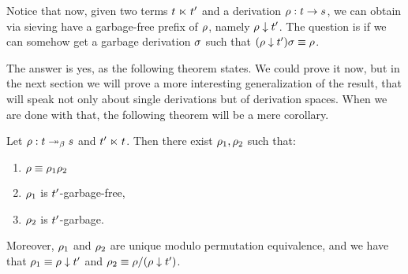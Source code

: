 Notice that now, given two terms $t \mathrel{\ltimes} t'$ and a derivation
$\rho : t \to s$, we can obtain via sieving have a garbage-free prefix
of $\rho$, namely $\rho \downarrow t'$.
The question is if we can somehow get a garbage derivation $\sigma$ such that
$(\rho \downarrow t') \sigma \equiv \rho$.

The answer is yes, as the following theorem states.
We could prove it now, but in the next section we will
prove a more interesting generalization of the result,
that will speak not only about single derivations
but of derivation spaces.
When we are done with that, the following theorem will be a mere corollary.


\begin{theorem}
Let $\rho : t \mathrel{\twoheadrightarrow_\beta} s$ and $t' \mathrel{\ltimes} t$.
Then there exist $\rho_1,\rho_2$ such that:
\begin{enumerate}
\item $\rho \equiv \rho_1\rho_2$
\item $\rho_1$ is $t'$-garbage-free,
\item $\rho_2$ is $t'$-garbage.
\end{enumerate}
Moreover, $\rho_1$ and $\rho_2$ are unique modulo permutation equivalence,
and we have that
$\rho_1 \equiv \rho \downarrow t'$ and $\rho_2 \equiv \rho/(\rho \downarrow t')$.
\end{theorem}

